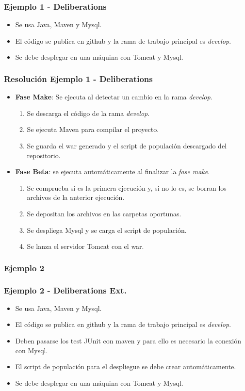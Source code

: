 \documentclass[
xcolor={svgnames},
hyperref={colorlinks,citecolor=DeepPink4,linkcolor=Black,urlcolor=DarkBlue}
]{beamer}
\begin{document}
\begin{frame}
	\frametitle{Ejemplo 1 - Deliberations}
	\begin{itemize}
		\item Se usa Java, Maven y Mysql.
		\item El código se publica en github y la rama de trabajo principal es \textit{develop}.
		\item Se debe desplegar en una máquina con Tomcat y Mysql. 
	\end{itemize}
\end{frame}

\begin{frame}
	\frametitle{Resolución Ejemplo 1 - Deliberations}
		\begin{itemize}
			\item \textbf{Fase Make}: Se ejecuta al detectar un cambio en la rama \textit{develop}.
			\begin{enumerate}
				\item Se descarga el código de la rama \textit{develop}.
				\item Se ejecuta Maven para compilar el proyecto.
				\item Se guarda el war generado y el script de populación descargado del repositorio.
			\end{enumerate}
			\item \textbf{Fase Beta}: se ejecuta automáticamente al finalizar la \textit{fase make}.
			\begin{enumerate}
				\item Se comprueba si es la primera ejecución y, si no lo es, se borran los archivos de la anterior ejecución.
				\item Se depositan los archivos en las carpetas oportunas.
				\item Se despliega Mysql y se carga el script de populación.
				\item Se lanza el servidor Tomcat con el war.
			\end{enumerate}
	\end{itemize}
\end{frame}

\subsubsection{Ejemplo 2}

\begin{frame}
	\frametitle{Ejemplo 2 - Deliberations Ext.}
		\begin{itemize}
		\item Se usa Java, Maven y Mysql.
		\item El código se publica en github y la rama de trabajo principal es \textit{develop}.
		\item Deben pasarse los test JUnit con maven y para ello es necesario la conexión con Mysql.
		\item El script de populación para el despliegue se debe crear automáticamente.
		\item Se debe desplegar en una máquina con Tomcat y Mysql.
	\end{itemize}
\end{frame}
\end{document}
